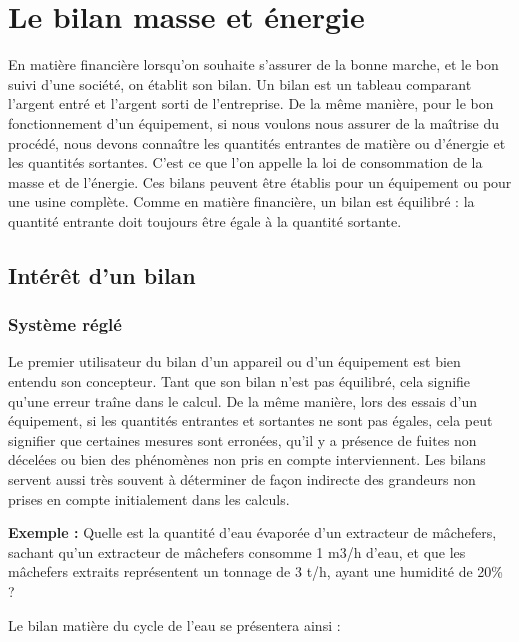 \chapter{Le bilan masse et énergie}

En matière financière lorsqu’on souhaite s’assurer de la bonne marche, et le bon suivi d’une société, on établit son bilan. Un bilan est un tableau comparant l’argent entré et l’argent sorti de l’entreprise. De la même manière, pour le bon fonctionnement d’un équipement, si nous voulons nous assurer de la maîtrise du procédé, nous devons connaître les quantités entrantes de matière ou d’énergie et les quantités sortantes. C’est ce que l’on appelle la loi de consommation de la masse et de l’énergie.
Ces bilans peuvent être établis pour un équipement ou pour une usine complète. Comme en matière financière, un bilan est équilibré : la quantité entrante doit toujours être égale à la quantité sortante.


\section{Intérêt d'un bilan}

\subsection{Système réglé}

Le premier utilisateur du bilan d’un appareil ou d’un équipement est bien entendu son concepteur. Tant que son bilan n’est pas équilibré, cela signifie qu’une erreur traîne dans le calcul.
De la même manière, lors des essais d’un équipement, si les quantités entrantes et sortantes ne sont pas égales, cela peut signifier que certaines mesures sont erronées, qu’il y a présence de fuites non décelées ou bien des phénomènes non pris en compte interviennent.
Les bilans servent aussi très souvent à déterminer de façon indirecte des grandeurs non prises en compte initialement dans les calculs.

\vspace{0.3cm}

\textbf{Exemple :}
Quelle est la quantité d’eau évaporée d’un extracteur de mâchefers, sachant qu’un extracteur de mâchefers consomme 1 m3/h d’eau, et que les mâchefers extraits représentent un tonnage de 3 t/h, ayant une humidité de 20\% ?

\vspace{0.3cm}
Le bilan matière du cycle de l’eau se présentera ainsi :

